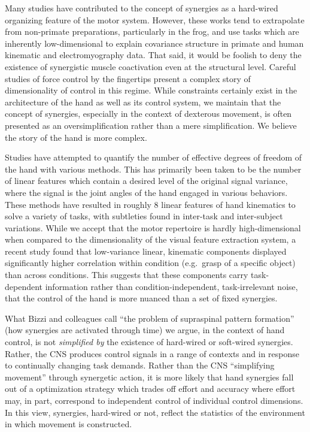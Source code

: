 \documentclass[../main.tex]{subfiles}
\begin{document}
Many studies have contributed to the concept of synergies as a hard-wired organizing feature of the motor system\cite{mussa-ivaldiMotorLearningCombination2000b,DAvella2003}. However, these works tend to extrapolate from non-primate preparations, particularly in the frog, and use tasks which are inherently low-dimensional to explain covariance structure in primate and human kinematic and electromyography data\cite{giszterMotorPrimitivesNew2015,gaoTheoryMultineuronalDimensionality2017}. That said, it would be foolish to deny the existence of synergistic muscle coactivation even at the structural level. Careful studies of force control by the fingertips present a complex story of dimensionality of control in this regime\cite{raczSpatiotemporalAnalysisReveals2013}. While constraints certainly exist in the architecture of the hand as well as its control system, we maintain that the concept of synergies, especially in the context of dexterous movement, is often presented as an oversimplification rather than a mere simplification. We believe the story of the hand is more complex.

Studies have attempted to quantify the number of effective degrees of freedom of the hand with various methods. This has primarily been taken to be the number of linear features which contain a desired level of the original signal variance, where the signal is the joint angles of the hand engaged in various behaviors\cite{Ingram2009,TodorovDimensionality2005}. These methods have resulted in roughly 8 linear features of hand kinematics to solve a variety of tasks, with subtleties found in inter-task and inter-subject variations. While we accept that the motor repertoire is hardly high-dimensional when compared to the dimensionality of the visual feature extraction system, a recent study found that low-variance linear, kinematic components displayed significantly higher correlation within condition (e.g.~grasp of a specific object) than across conditions. This suggests that these components carry task-dependent information rather than condition-independent, task-irrelevant noise, that the control of the hand is more nuanced than a set of fixed synergies\cite{yanUnexpectedComplexityEveryday2020}.

What Bizzi and colleagues call ``the problem of supraspinal pattern formation'' (how synergies are activated through time) we argue, in the context of hand control, is not \textit{simplified by} the existence of hard-wired or soft-wired synergies\cite{bizziMotorPlanningExecution2020}. Rather, the CNS produces control signals in a range of contexts and in response to continually changing task demands. Rather than the CNS ``simplifying movement'' through synergetic action, it is more likely that hand synergies fall out of a optimization strategy which trades off effort and accuracy where effort may, in part, correspond to independent control of individual control dimensions. In this view, synergies, hard-wired or not, reflect the statistics of the environment in which movement is constructed\cite{brutonSynergiesCoordinationComprehensive2018}.
\end{document}
